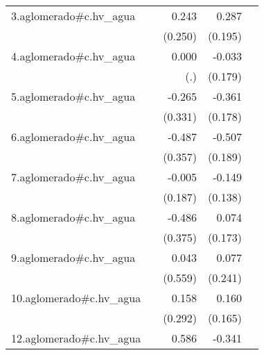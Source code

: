 {\begin{longtable}{l*{4}{D{.}{.}{-1}}}
\addlinespace
3.aglomerado#c.hv\_agua&                     &       0.243         &       0.287         &                     \\
            &                     &     (0.250)         &     (0.195)         &                     \\
\addlinespace
4.aglomerado#c.hv\_agua&                     &       0.000         &      -0.033         &                     \\
            &                     &         (.)         &     (0.179)         &                     \\
\addlinespace
5.aglomerado#c.hv\_agua&                     &      -0.265         &      -0.361\sym{*}  &                     \\
            &                     &     (0.331)         &     (0.178)         &                     \\
\addlinespace
6.aglomerado#c.hv\_agua&                     &      -0.487         &      -0.507\sym{**} &                     \\
            &                     &     (0.357)         &     (0.189)         &                     \\
\addlinespace
7.aglomerado#c.hv\_agua&                     &      -0.005         &      -0.149         &                     \\
            &                     &     (0.187)         &     (0.138)         &                     \\
\addlinespace
8.aglomerado#c.hv\_agua&                     &      -0.486         &       0.074         &                     \\
            &                     &     (0.375)         &     (0.173)         &                     \\
\addlinespace
9.aglomerado#c.hv\_agua&                     &       0.043         &       0.077         &                     \\
            &                     &     (0.559)         &     (0.241)         &                     \\
\addlinespace
10.aglomerado#c.hv\_agua&                     &       0.158         &       0.160         &                     \\
            &                     &     (0.292)         &     (0.165)         &                     \\
\addlinespace
12.aglomerado#c.hv\_agua&                     &       0.586         &      -0.341         &                     \\

\end{longtable}}
